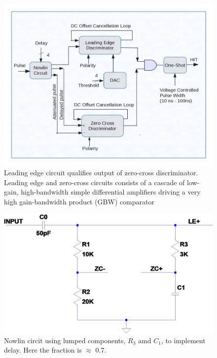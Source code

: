 \documentclass[12pt, onecolumn]{IEEEtran}
\begin{document}
\begin{figure}[htbp!]
	\centering
 	\includegraphics[scale=0.4,keepaspectratio=true]{./images/DISC16block.jpg}
 	\caption{Leading edge circuit qualifies output of zero-cross discriminator.  Leading edge and zero-cross circuits consists of a cascade of low-gain, high-bandwidth simple differential amplifiers driving a very high gain-bandwidth product (GBW) comparator }
 	\label{BlockDiagram}
\end{figure}

\begin{figure}[htbp!]
	\centering
 	\includegraphics[scale=0.3,keepaspectratio=true]{./images/nowlin.jpg}
 	\caption{Nowlin circit using lumped components, $R_3 \text{ amd } C_1$, to implement delay. Here the fraction is $\approx$ 0.7.}
 	\label{Nowlin}
\end{figure}
\end{document}
